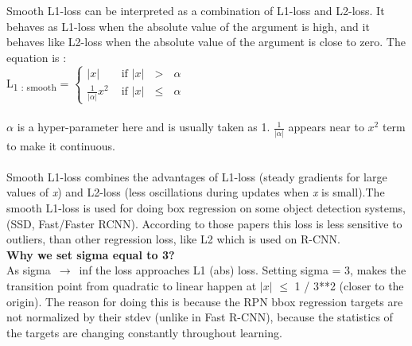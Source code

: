 \documentclass{article}
\begin{document}
Smooth L1-loss can be interpreted as a combination of L1-loss and L2-loss. It behaves as L1-loss when the absolute
value of the argument is high, and it behaves like L2-loss when the absolute value of the argument is close to zero.
The equation is : \\

L\textsubscript{1 : smooth}  = $\begin{cases}
  \lvert {x}\rvert & \mbox{ if } \lvert { x }\rvert \mbox{ $>$ $\alpha$ } \\ 
  \frac{1}{   \lvert { \alpha } \rvert   }  x^2  &   \mbox{ if }  \lvert {x}\rvert \mbox { $\leq$  $\alpha$ }
\end{cases}$
\\ \\
$\alpha$ is a hyper-parameter here and is usually taken as 1. $\frac{1}{ \lvert { \alpha } \rvert } $ appears near to $x^2$ term
to make it continuous.
\\ \\
Smooth L1-loss combines the advantages of L1-loss (steady gradients for large values of \textit{x}) and L2-loss (less oscillations during
updates when \textit{x} is small).The smooth L1-loss is used for doing box regression on some object detection systems, (SSD, Fast/Faster RCNN). According to those papers this loss is less sensitive to  outliers, than other regression loss, like L2 which is used on R-CNN. \\


\textbf{Why we set sigma equal to  3?} \\

As sigma $\, \to \,$  inf the loss approaches L1 (abs) loss. Setting sigma = 3, makes the transition point from quadratic to linear happen
at $\lvert{x} \rvert$ $\leq$ 1 / 3**2 (closer to the origin). The reason for doing this is because the RPN bbox regression targets are not normalized
by their stdev (unlike in Fast R-CNN), because the statistics of the targets are changing constantly throughout learning.
\end{document}
